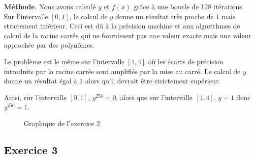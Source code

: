\documentclass[a4paper,11pt]{article}
\theoremstyle{nonumberplain}
\begin{document}
    \textbf{Méthode}. Nous avons calculé $y$ et $f(x)$ grâce à une boucle de 128 itérations.
    Sur l'intervalle $[0, 1]$, le calcul de $y$ donne un résultat très proche de $1$ mais strictement inférieur. Ceci est dû à la précision machine
    et aux algorithmes de calcul de la racine carrée qui ne fournissent pas une valeur exacte mais une valeur approchée par des polynômes.

    Le problème est le même sur l'intervalle $[1, 4]$ où les écarts de précision introduits par la racine carrée sont amplifiés par la mise au carré. Le calcul de $y$ donne
    un résultat égal à $1$ alors qu'il devrait être strictement supérieur.

    Ainsi, sur l'intervalle $[0, 1]$, $y^{256} = 0$, alors que sur l'intervalle $[1, 4]$, $y = 1$ donc $y^{256} = 1$.

    \begin{figure}
        \centering
        \caption{\label{graph_exo2} Graphique de l'exercice 2}
    \end{figure}


\subsection*{Exercice 3}
\end{document}
